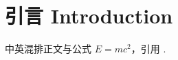 \documentclass[11pt]{article}
\begin{document}
\section{引言 Introduction}
中英混排正文与公式 $E=mc^2$，引用 \citep{agentikz}.
\begin{center}
\end{center}

\end{document}
